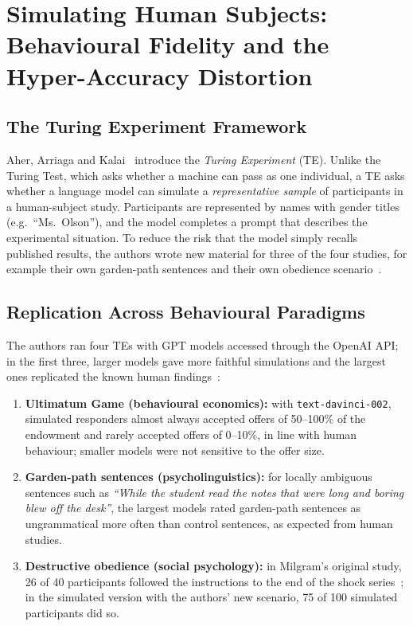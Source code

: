 \section{Simulating Human Subjects: Behavioural Fidelity and the Hyper-Accuracy Distortion}
\label{sec:persona_simulation}

\subsection{The Turing Experiment Framework}
Aher, Arriaga and Kalai~\cite{aher2023using} introduce the \emph{Turing Experiment} (TE). Unlike the Turing Test, which asks whether a machine can pass as one individual, a TE asks whether a language model can simulate a \emph{representative sample} of participants in a human-subject study. Participants are represented by names with gender titles (e.g.\ ``Ms.\ Olson''), and the model completes a prompt that describes the experimental situation. To reduce the risk that the model simply recalls published results, the authors wrote new material for three of the four studies, for example their own garden-path sentences and their own obedience scenario~\cite{aher2023using}. %

\subsection{Replication Across Behavioural Paradigms}
The authors ran four TEs with GPT models accessed through the OpenAI API; in the first three, larger models gave more faithful simulations and the largest ones replicated the known human findings~\cite{aher2023using}: %
\begin{enumerate}
    \item \textbf{Ultimatum Game (behavioural economics):} with \texttt{text-davinci-002}, simulated responders almost always accepted offers of 50--100\% of the endowment and rarely accepted offers of 0--10\%, in line with human behaviour; smaller models were not sensitive to the offer size. %
    \item \textbf{Garden-path sentences (psycholinguistics):} for locally ambiguous sentences such as \emph{``While the student read the notes that were long and boring blew off the desk''}, the largest models rated garden-path sentences as ungrammatical more often than control sentences, as expected from human studies. %
    \item \textbf{Destructive obedience (social psychology):} in Milgram's original study, 26 of 40 participants followed the instructions to the end of the shock series~\cite{milgram1963behavioral}; in the simulated version with the authors' new scenario, 75 of 100 simulated participants did so. %
\end{enumerate}

